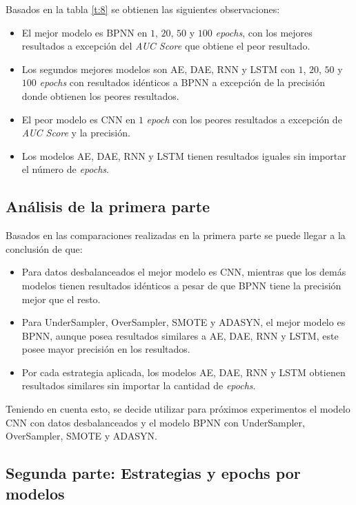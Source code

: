 Basados en la tabla \ref{t:8} se obtienen las siguientes observaciones:
\begin{itemize}
	\item El mejor modelo es BPNN en $1$, $20$, $50$ y $100$ \textit{epochs}, con los mejores resultados a excepci\'{o}n del \textit{AUC Score} que obtiene el peor resultado.
	\item Los segundos mejores modelos son AE, DAE, RNN y LSTM con $1$, $20$, $50$ y $100$ \textit{epochs} con resultados id\'{e}nticos a BPNN a excepci\'{o}n de la precisi\'{o}n donde obtienen los peores resultados.
	\item El peor modelo es CNN en $1$ \textit{epoch} con los peores resultados a excepci\'{o}n de \textit{AUC Score} y la precisi\'{o}n.
	\item Los modelos AE, DAE, RNN y LSTM tienen resultados iguales sin importar el n\'{u}mero de \textit{epochs}.
\end{itemize}

\subsection{An\'{a}lisis de la primera parte}
  Basados en las comparaciones realizadas en la primera parte se puede llegar a la conclusi\'{o}n de que:
  \begin{itemize}
  	\item Para datos desbalanceados el mejor modelo es CNN, mientras que los dem\'{a}s modelos tienen resultados id\'{e}nticos a pesar de que BPNN tiene la precisi\'{o}n mejor que el resto.
  	\item Para UnderSampler, OverSampler, SMOTE y ADASYN, el mejor modelo es BPNN, aunque posea resultados similares a AE, DAE, RNN y LSTM, este posee mayor precisi\'{o}n en los resultados.
  	\item Por cada estrategia aplicada, los modelos AE, DAE, RNN y LSTM obtienen resultados similares sin importar la cantidad de \textit{epochs}.
  \end{itemize}

  Teniendo en cuenta esto, se decide utilizar para pr\'{o}ximos experimentos el modelo CNN con datos desbalanceados y el modelo BPNN con UnderSampler, OverSampler, SMOTE y ADASYN.

\subsection{Segunda parte: Estrategias y epochs por modelos}

